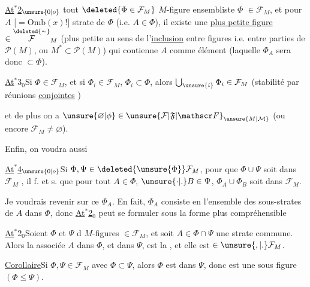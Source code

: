 \uline{At$^{*}$2}$_{\unsure{0|o}}$\quad
\margin{\rule{0.45pt}{4\baselineskip}}
 tout $\deleted{\Phi\in\mathcal F_M}$ $M$-figure ensembliste $\Phi$  $\in\mathcal F_M$, et pour $A$ [$=\mathrm{Omb}(x)$!]  strate de $\Phi$ (i.e. $A\in\Phi$), il existe une \uline{plus petite figure}   $\in\overset{\deleted{\sim}}{\mathcal F}_M$
(plus petite au sens de l'\uline{inclusion} \deleted{\unsure{)}} entre figures i.e. entre parties de $\mathcal P(M)$, ou  $M^{*}\subset\mathcal P(M)$) qui contienne $A$ comme élément (laquelle $\Phi_A$ sera donc $\subset\Phi$).

\uline{At$^{*}$}3$_0$\quad Si $\Phi\in\mathcal F_M$, et si  $\Phi_i\in\mathcal F_M$, $\Phi_i\subset\Phi$, alors $\bigcup_{\unsure{i}}\Phi_i\in\mathcal F_M$ (stabilité par réunions \uline{conjointes} )

et de plus on a $\unsure{\varnothing|\phi}\in\unsure{\mathcal F|\mathfrak F|\mathscr F}_{\unsure{M|\mathcal{M}}}$ (ou encore $\mathcal F_M\neq\varnothing$).

Enfin, on voudra aussi

\uline{At$^{*}$4}$_{\unsure{0|o}}$\quad Si $\Phi,\Psi\in\deleted{\unsure{\Phi}}\mathcal F_M$, pour que $\Phi\cup\Psi$ soit  dans $\mathcal F_M$ , il f. et s. que pour tout $A\in\Phi$, $\unsure{\cdot|.}B\in\Psi$, $\Phi_A\cup\Phi_B$ soit dans $\mathcal F_M$.

Je voudrais revenir sur ce $\Phi_A$. En fait, $\Phi_A$ consiste en l'ensemble des sous-strates de $A$ dans $\Phi$, donc \uline{At$^{*}$2}$_0$ peut se formuler sous la forme plus compréhensible

\uline{At$^{*}$}2$_0$\quad Soient $\Phi$ et $\Psi$ d $M$-figures $\in\mathcal F_M$, et soit $A\in\Phi\cap\Psi$ une strate commune. Alors la  associée  $A$ dans $\Phi$, et dans $\Psi$, est la , et elle est $\in\unsure{,|.}\mathcal F_M$.

\uline{Corollaire}\quad Si $\Phi,\Psi\in\mathcal F_M$ avec $\Phi\subset\Psi$, alors $\Phi$ est  dans $\Psi$, donc est une sous figure $(\Phi\leq\Psi)$.

